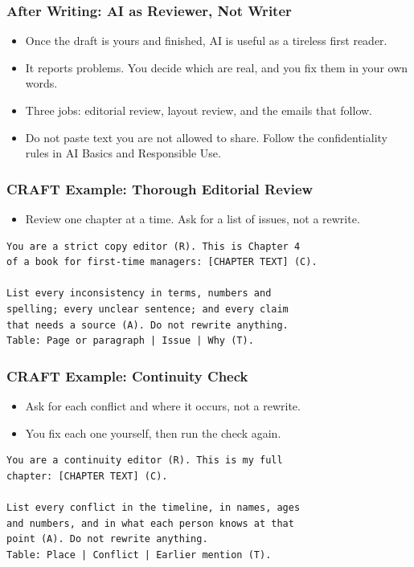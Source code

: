 
\begin{frame}[fragile]\frametitle{After Writing: AI as Reviewer, Not Writer}
\begin{itemize}
\item Once the draft is yours and finished, AI is useful as a tireless first reader.
\item It reports problems. You decide which are real, and you fix them in your own words.
\item Three jobs: editorial review, layout review, and the emails that follow.
\item Do not paste text you are not allowed to share. Follow the confidentiality rules in AI Basics and Responsible Use.
\end{itemize}
\end{frame}

\begin{frame}[fragile]\frametitle{CRAFT Example: Thorough Editorial Review}
\begin{itemize}
\item Review one chapter at a time. Ask for a list of issues, not a rewrite.
\end{itemize}
\begin{lstlisting}[language=HTML]
You are a strict copy editor (R). This is Chapter 4
of a book for first-time managers: [CHAPTER TEXT] (C).

List every inconsistency in terms, numbers and
spelling; every unclear sentence; and every claim
that needs a source (A). Do not rewrite anything.
Table: Page or paragraph | Issue | Why (T).
\end{lstlisting}
\end{frame}

\begin{frame}[fragile]\frametitle{CRAFT Example: Continuity Check}
\begin{itemize}
\item Ask for each conflict and where it occurs, not a rewrite.
\item You fix each one yourself, then run the check again.
\end{itemize}
\begin{lstlisting}[language=HTML]
You are a continuity editor (R). This is my full
chapter: [CHAPTER TEXT] (C).

List every conflict in the timeline, in names, ages
and numbers, and in what each person knows at that
point (A). Do not rewrite anything.
Table: Place | Conflict | Earlier mention (T).
\end{lstlisting}
\end{frame}

